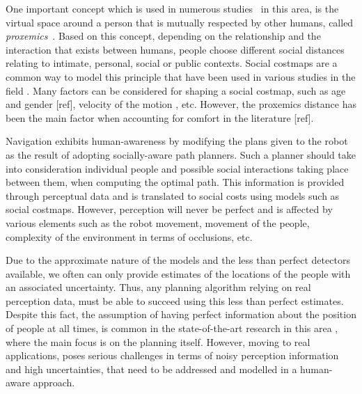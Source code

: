 One important concept which is used in numerous studies~\cite{Mumm2011,Takayama2009,Walters2011,ferrer2013robot} in this area, is the virtual space around a person that is mutually respected by other humans, called \textit{proxemics}~\cite{Hall1969}.
Based on this concept, depending on the relationship and the interaction that exists between humans, people choose different social distances relating to intimate, personal, social or public contexts.
Social costmaps are a common way to model this principle that have been used in various studies in the field \cite{svenstrup2010trajectory}. Many factors can be considered for shaping a social costmap, such as age and gender [ref], velocity of the motion \cite{kirby2009companion}, etc. However, the proxemics distance has been the main factor when accounting for comfort in the literature [ref].%

Navigation exhibits human-awareness by modifying the plans given to the robot as the result of adopting socially-aware path planners.
Such a planner should take into consideration individual people and possible social interactions taking place between them, when computing the optimal path. This information is provided through perceptual data and is translated to social costs using models such as social costmaps. However, perception will never be perfect and is affected by various elements such as the robot movement, movement of the people, complexity of the environment in terms of occlusions, etc. 


Due to the approximate nature of the models and the less than perfect detectors available, we often can only provide estimates of the locations of the people with an associated uncertainty. Thus, any planning algorithm relying on real perception data, must be able to succeed using this less than perfect estimates. Despite this fact, the assumption of having perfect information about the position of people at all times, is common in the state-of-the-art research in this area , where the main focus is on the planning itself. However, moving to real applications, poses serious challenges in terms of noisy perception information and high uncertainties, that need to be addressed and modelled in a human-aware approach.


